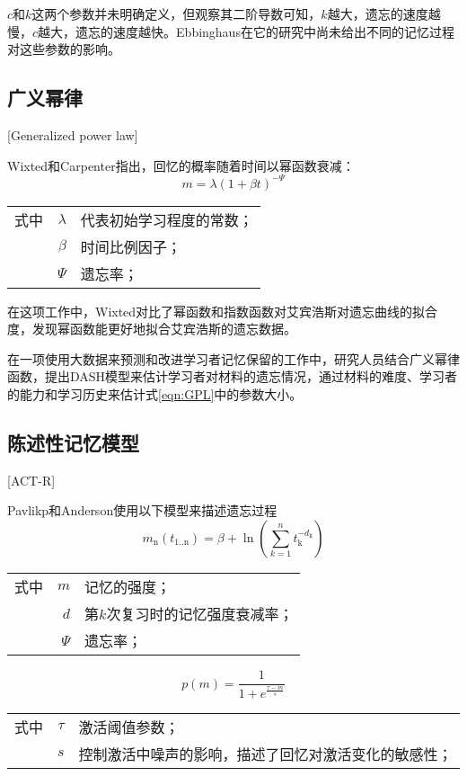 $c$和$k$这两个参数并未明确定义，但观察其二阶导数可知，$k$越大，遗忘的速度越慢，$c$越大，遗忘的速度越快。Ebbinghaus在它的研究中尚未给出不同的记忆过程对这些参数的影响。

\subsection{广义幂律}[Generalized power law]

Wixted和Carpenter\cite{wixtedWickelgrenPowerLaw2007}指出，回忆的概率随着时间以幂函数衰减：
\begin{equation}
\label{eqn:GPL}
m=\lambda(1+\beta t)^{-\Psi}
\end{equation}
\begin{tabularx}{\textwidth}{@{}l@{\quad}r@{———}X@{}}
    式中& $\lambda$ &代表初始学习程度的常数；\\
    &  $\beta$ &时间比例因子；\\
    &  $\Psi$ &遗忘率；
\end{tabularx}\vspace{3.15bp}

在这项工作中，Wixted对比了幂函数和指数函数对艾宾浩斯对遗忘曲线的拟合度，发现幂函数能更好地拟合艾宾浩斯的遗忘数据。

在一项使用大数据来预测和改进学习者记忆保留的工作中，研究人员结合广义幂律函数，提出DASH模型来估计学习者对材料的遗忘情况，通过材料的难度、学习者的能力和学习历史来估计式\ref{eqn:GPL}中的参数大小\cite{jonesPredictingImprovingMemory2016}。

\subsection{陈述性记忆模型}[ACT-R]

Pavlikp和Anderson\cite{pavlikUsingModelCompute2008}使用以下模型来描述遗忘过程
\begin{equation}
m_\mathrm{n}(t_\mathrm{1..n}) = \beta + \ln(\sum\limits_{k=1}^n t_\mathrm{k}^{-d_\mathrm{k}})
\end{equation}
\begin{tabularx}{\textwidth}{@{}l@{\quad}r@{———}X@{}}
    式中& $m$ &记忆的强度；\\
    & $d$ &第$k$次复习时的记忆强度衰减率；\\
    & $\Psi$ &遗忘率；
\end{tabularx}\vspace{3.15bp}
\begin{equation}
p(m) = \frac{1}{1+e^{\frac{\tau-m}{s}}}
\end{equation}
\begin{tabularx}{\textwidth}{@{}l@{\quad}r@{———}X@{}}
    式中& $\tau$ &激活阈值参数；\\
    & $s$ &控制激活中噪声的影响，描述了回忆对激活变化的敏感性；
\end{tabularx}\vspace{3.15bp}

